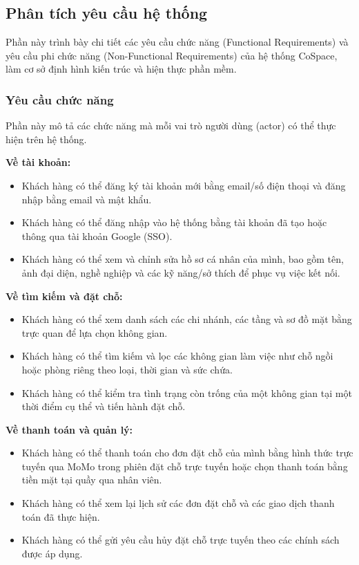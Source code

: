 \subsection{Phân tích yêu cầu hệ thống}

Phần này trình bày chi tiết các yêu cầu chức năng (Functional Requirements) và yêu cầu phi chức năng (Non-Functional Requirements) của hệ thống CoSpace, làm cơ sở định hình kiến trúc và hiện thực phần mềm.

\subsubsection{Yêu cầu chức năng}

Phần này mô tả các chức năng mà mỗi vai trò người dùng (actor) có thể thực hiện trên hệ thống.


\textbf{Về tài khoản:}

\begin{itemize}
    \item Khách hàng có thể đăng ký tài khoản mới bằng email/số điện thoại và đăng nhập bằng email và mật khẩu.
    \item Khách hàng có thể đăng nhập vào hệ thống bằng tài khoản đã tạo hoặc thông qua tài khoản Google (SSO).
    \item Khách hàng có thể xem và chỉnh sửa hồ sơ cá nhân của mình, bao gồm tên, ảnh đại diện, nghề nghiệp và các kỹ năng/sở thích để phục vụ việc kết nối.
\end{itemize}

\textbf{Về tìm kiếm và đặt chỗ:}

\begin{itemize}
    \item Khách hàng có thể xem danh sách các chi nhánh, các tầng và sơ đồ mặt bằng trực quan để lựa chọn không gian.
    \item Khách hàng có thể tìm kiếm và lọc các không gian làm việc như chỗ ngồi hoặc phòng riêng theo loại, thời gian và sức chứa.
    \item Khách hàng có thể kiểm tra tình trạng còn trống của một không gian tại một thời điểm cụ thể và tiến hành đặt chỗ.
\end{itemize}

\textbf{Về thanh toán và quản lý:}

\begin{itemize}
    \item Khách hàng có thể thanh toán cho đơn đặt chỗ của mình bằng hình thức trực tuyến qua MoMo trong phiên đặt chỗ trực tuyến hoặc chọn thanh toán bằng tiền mặt tại quầy qua nhân viên.
    \item Khách hàng có thể xem lại lịch sử các đơn đặt chỗ và các giao dịch thanh toán đã thực hiện.
    \item Khách hàng có thể gửi yêu cầu hủy đặt chỗ trực tuyến theo các chính sách được áp dụng.
\end{itemize}

